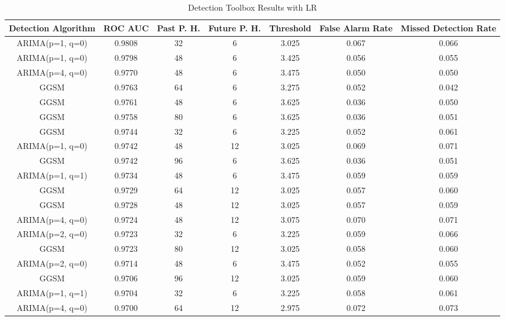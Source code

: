 \begin{table*}[h!]
\centering
\caption{Detection Toolbox Results with LR}
    \label{table:lrexperimenttwo}
    \begin{tabular}{|c|c|c|c|c|c|c|}
        \hline
        Detection Algorithm & ROC AUC & Past P. H. & Future P. H. & Threshold & False Alarm Rate & Missed Detection Rate \\
        \hline
        \hline
        ARIMA(p=1, q=0) & 0.9808 & 32 & 6 & 3.025 &  0.067 & 0.066 \\
        \hline
        ARIMA(p=1, q=0) & 0.9798 & 48 & 6 & 3.425 &  0.056 & 0.055 \\
        \hline
        ARIMA(p=4, q=0) & 0.9770 & 48 & 6 & 3.475 &  0.050 & 0.050 \\
        \hline
        GGSM & 0.9763 & 64 & 6 & 3.275 &  0.052 & 0.042 \\
        \hline
        GGSM & 0.9761 & 48 & 6 & 3.625 &  0.036 & 0.050 \\
        \hline
        GGSM & 0.9758 & 80 & 6 & 3.625 &  0.036 & 0.051 \\
        \hline
        GGSM & 0.9744 & 32 & 6 & 3.225 &  0.052 & 0.061 \\
        \hline
        ARIMA(p=1, q=0) & 0.9742 & 48 & 12 & 3.025 &  0.069 & 0.071 \\
        \hline
        GGSM & 0.9742 & 96 & 6 & 3.625 &  0.036 & 0.051 \\
        \hline
        ARIMA(p=1, q=1) & 0.9734 & 48 & 6 & 3.475 &  0.059 & 0.059 \\
        \hline
        GGSM & 0.9729 & 64 & 12 & 3.025 &  0.057 & 0.060 \\
        \hline
        GGSM & 0.9728 & 48 & 12 & 3.025 &  0.057 & 0.059 \\
        \hline
        ARIMA(p=4, q=0) & 0.9724 & 48 & 12 & 3.075 &  0.070 & 0.071 \\
        \hline
        ARIMA(p=2, q=0) & 0.9723 & 32 & 6 & 3.225 &  0.059 & 0.066 \\
        \hline
        GGSM & 0.9723 & 80 & 12 & 3.025 &  0.058 & 0.060 \\
        \hline
        ARIMA(p=2, q=0) & 0.9714 & 48 & 6 & 3.475 &  0.052 & 0.055 \\
        \hline
        GGSM & 0.9706 & 96 & 12 & 3.025 &  0.059 & 0.060 \\
        \hline
        ARIMA(p=1, q=1) & 0.9704 & 32 & 6 & 3.225 &  0.058 & 0.061 \\
        \hline
        ARIMA(p=4, q=0) & 0.9700 & 64 & 12 & 2.975 &  0.072 & 0.073 \\

\end{tabular}
\end{table*}
